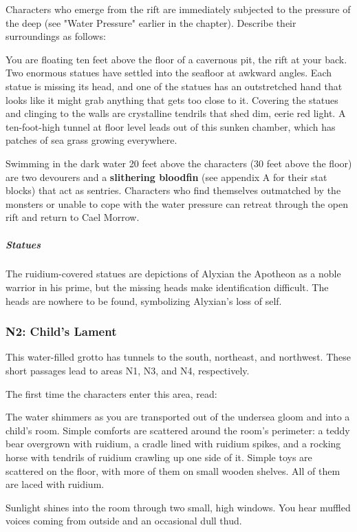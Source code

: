 \documentclass[10pt,a4paper,twoside,fancy,bg=print,twocolumn,openany,nodeprecatedcode]{dndbook}
\begin{document}
Characters who emerge from the rift are immediately subjected to the pressure of the deep (see "Water Pressure" earlier in the chapter). Describe their surroundings as follows:

\begin{DndReadAloud}{}
You are floating ten feet above the floor of a cavernous pit, the rift at your back. Two enormous statues have settled into the seafloor at awkward angles. Each statue is missing its head, and one of the statues has an outstretched hand that looks like it might grab anything that gets too close to it. Covering the statues and clinging to the walls are crystalline tendrils that shed dim, eerie red light. A ten-foot-high tunnel at floor level leads out of this sunken chamber, which has patches of sea grass growing everywhere.

\end{DndReadAloud}

Swimming in the dark water 20 feet above the characters (30 feet above the floor) are two devourers and a \textbf{slithering bloodfin} (see appendix A for their stat blocks) that act as sentries. Characters who find themselves outmatched by the monsters or unable to cope with the water pressure can retreat through the open rift and return to Cael Morrow.

\subparagraph{Statues}
The ruidium-covered statues are depictions of Alyxian the Apotheon as a noble warrior in his prime, but the missing heads make identification difficult. The heads are nowhere to be found, symbolizing Alyxian's loss of self.

\subsubsection{N2: Child's Lament}
This water-filled grotto has tunnels to the south, northeast, and northwest. These short passages lead to areas N1, N3, and N4, respectively.

The first time the characters enter this area, read:

\begin{DndReadAloud}{}
The water shimmers as you are transported out of the undersea gloom and into a child's room. Simple comforts are scattered around the room's perimeter: a teddy bear overgrown with ruidium, a cradle lined with ruidium spikes, and a rocking horse with tendrils of ruidium crawling up one side of it. Simple toys are scattered on the floor, with more of them on small wooden shelves. All of them are laced with ruidium.

Sunlight shines into the room through two small, high windows. You hear muffled voices coming from outside and an occasional dull thud.

\end{DndReadAloud}
\end{document}
